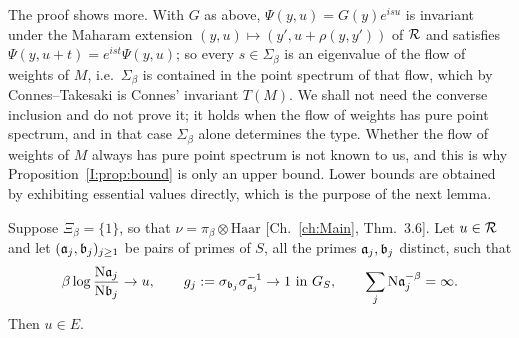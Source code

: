 \begin{remark}\label{I:rem:flow}
The proof shows more. With $G$ as above, $\Psi(y,u)=G(y)e^{isu}$ is invariant under the
Maharam extension $(y,u)\mapsto(y',u+\rho(y,y'))$ of $\mathcal{R}$ \cite{Maharam} and satisfies
$\Psi(y,u+t)=e^{ist}\Psi(y,u)$; so every $s\in\Sigma_\beta$ is an eigenvalue of the flow of
weights of $M$, i.e.\ $\Sigma_\beta$ is contained in the point spectrum of that flow, which by
Connes--Takesaki \cite{ConnesTakesaki} is Connes' invariant $T(M)$. We shall not need the converse
inclusion and do not prove it; it holds when the flow of weights has pure point spectrum,
and in that case $\Sigma_\beta$ alone determines the type. Whether the flow of weights of
$M$ always has pure point spectrum is not known to us, and this is why
Proposition~\ref{I:prop:bound} is only an upper bound. Lower bounds are obtained by exhibiting
essential values directly, which is the purpose of the next lemma.
\end{remark}

\begin{lemma}\label{I:lem:pairs}
Suppose $\Xi_\beta=\{1\}$, so that $\nu=\pi_\beta\otimes\mathrm{Haar}$ [Ch.~\ref{ch:Main}, Thm.~3.6].
Let $u\in\mathcal{R}$ and let $(\mathfrak{a}_j,\mathfrak{b}_j)_{j\ge1}$ be pairs of primes of $S$, all the primes
$\mathfrak{a}_j,\mathfrak{b}_j$ distinct, such that
\[
\beta\log\frac{\mathrm{N}\mathfrak{a}_j}{\mathrm{N}\mathfrak{b}_j}\to u,\qquad
g_j:=\sigma_{\mathfrak{b}_j}\sigma_{\mathfrak{a}_j}^{-1}\to1\ \text{in}\ G_S,\qquad
\sum_j\mathrm{N}\mathfrak{a}_j^{-\beta}=\infty .
\]
Then $u\in E$.
\end{lemma}

